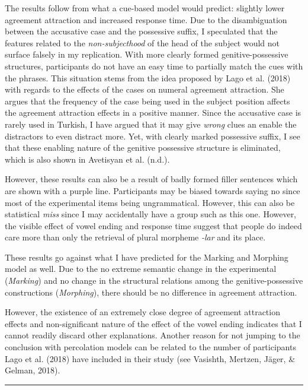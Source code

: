 \documentclass[doc]{apa6}
\begin{document}
The results follow from what a cue-based model would predict: slightly lower agreement attraction and increased response time. Due to the disambiguation between the accusative case and the possessive suffix, I speculated that the features related to the \emph{non-subjecthood} of the head of the subject would not surface falsely in my replication. With more clearly formed genitive-possessive structures, participants do not have an easy time to partially match the cues with the phrases. This situation stems from the idea proposed by Lago et al. (2018) with regards to the effects of the cases on numeral agreement attraction. She argues that the frequency of the case being used in the subject position affects the agreement attraction effects in a positive manner. Since the accusative case is rarely used in Turkish, I have argued that it may give \emph{wrong} clues an enable the distractors to even distract more. Yet, with clearly marked possessive suffix, I see that these enabling nature of the genitive possessive structure is eliminated, which is also shown in Avetisyan et al. (n.d.).

However, these results can also be a result of badly formed filler sentences which are shown with a purple line. Participants may be biased towards saying no since most of the experimental items being ungrammatical. However, this can also be statistical \emph{miss} since I may accidentally have a group such as this one. However, the visible effect of vowel ending and response time suggest that people do indeed care more than only the retrieval of plural morpheme \emph{-lar} and its place.

These results go against what I have predicted for the Marking and Morphing model as well. Due to the no extreme semantic change in the experimental (\emph{Marking}) and no change in the structural relations among the genitive-possessive constructions (\emph{Morphing}), there should be no difference in agreement attraction.

However, the existence of an extremely close degree of agreement attraction effects and non-significant nature of the effect of the vowel ending indicates that I cannot readily discard other explanations. Another reason for not jumping to the conclusion with percolation models can be related to the number of participants Lago et al. (2018) have included in their study (see Vasishth, Mertzen, Jäger, \& Gelman, 2018).

\begin{center}\rule{0.5\linewidth}{\linethickness}\end{center}
\end{document}
